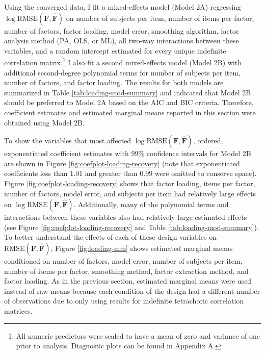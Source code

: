 \documentclass[
  english,
  man]{apa6}
\begin{document}
Using the converged data, I fit a mixed-effects model (Model 2A) regressing \(\log \textrm{RMSE}(\mathbf{F}, \hat{\mathbf{F}})\) on number of subjects per item, number of items per factor, number of factors, factor loading, model error, smoothing algorithm, factor analysis method (PA, OLS, or ML), all two-way interactions between these variables, and a random intercept estimated for every unique indefinite correlation matrix.\footnote{All numeric predictors were scaled to have a mean of zero and variance of one prior to analysis. Diagnostic plots can be found in Appendix A.} I also fit a second mixed-effects model (Model 2B) with additional second-degree polynomial terms for number of subjects per item, number of factors, and factor loading. The results for both models are summarized in Table \ref{tab:loading-mod-summary} and indicated that Model 2B should be preferred to Model 2A based on the AIC and BIC criteria. Therefore, coefficient estimates and estimated marginal means reported in this section were obtained using Model 2B.

To show the variables that most affected \(\log \textrm{RMSE}(\mathbf{F}, \hat{\mathbf{F}})\), ordered, exponentiated coefficient estimates with 99\% confidence intervals for Model 2B are shown in Figure \ref{fig:coefplot-loading-recovery} (note that exponentiated coefficients less than 1.01 and greater than 0.99 were omitted to conserve space). Figure \ref{fig:coefplot-loading-recovery} shows that factor loading, items per factor, number of factors, model error, and subjects per item had relatively large effects on \(\log \textrm{RMSE}(\mathbf{F}, \hat{\mathbf{F}})\). Additionally, many of the polynomial terms and interactions between these variables also had relatively large estimated effects (see Figure \ref{fig:coefplot-loading-recovery} and Table \ref{tab:loading-mod-summary}). To better understand the effects of each of these design variables on \(\textrm{RMSE}(\mathbf{F}, \hat{\mathbf{F}})\), Figure \ref{fig:loading-mm} shows estimated marginal means conditioned on number of factors, model error, number of subjects per item, number of items per factor, smoothing method, factor extraction method, and factor loading. As in the previous section, estimated marginal means were used instead of raw means because each condition of the design had a different number of observations due to only using results for indefinite tetrachoric correlation matrices.
\end{document}
